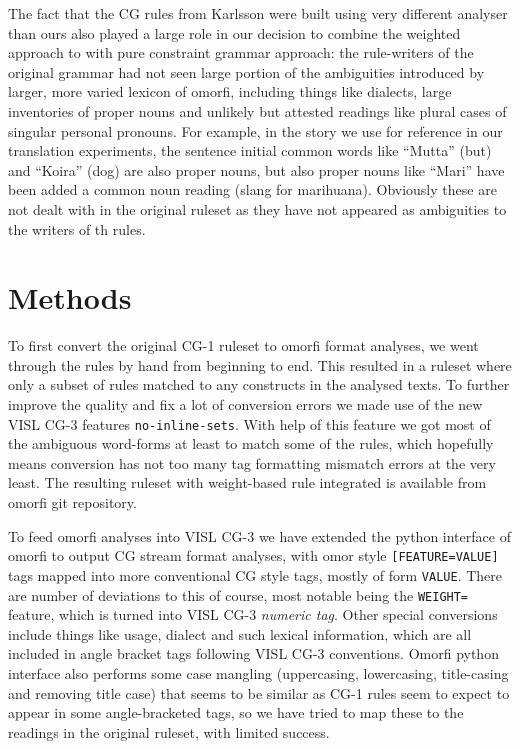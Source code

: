 \documentclass[11pt]{article}
\begin{document}
The fact that the CG rules from Karlsson were built using very different
analyser than ours also played a large role in our decision to combine the
weighted approach to with pure constraint grammar approach: the rule-writers
of the original grammar had not seen large portion of the ambiguities
introduced by larger, more varied lexicon of omorfi, including things like
dialects, large inventories of proper nouns and unlikely but attested
readings like plural cases of singular personal pronouns. For example, in
the story we use for reference in our translation experiments, the sentence
initial common words like ``Mutta'' (but) and ``Koira'' (dog)  are also
proper nouns, but also proper nouns like ``Mari'' have been added a
common noun reading (slang for marihuana). Obviously these are not dealt with
in the original ruleset as they have not appeared as ambiguities to the
writers of th rules.

\section{Methods}
\label{sec:methods}

To first convert the original CG-1 ruleset to omorfi format analyses, we went
through the rules by hand from beginning to end. This resulted in a ruleset
where only a subset of rules matched to any constructs in the analysed texts.
To further improve the quality and fix a lot of conversion errors we made use
of the new VISL CG-3 features \texttt{no-inline-sets}. With help of this
feature we got most of the ambiguous word-forms at least to match some of the
rules, which hopefully means conversion has not too many tag formatting 
mismatch errors at the very least. The resulting ruleset with weight-based
rule integrated is available from omorfi git repository.

To feed omorfi analyses into VISL CG-3 we have extended the python interface
of omorfi to output CG stream format analyses, with omor style
\texttt{[FEATURE=VALUE]} tags mapped into more conventional CG style tags,
mostly of form \texttt{VALUE}. There are number of deviations to this of
course, most notable being the \texttt{WEIGHT=} feature, which is turned into
VISL CG-3 \emph{numeric tag}. Other special conversions include things like
usage, dialect and such lexical information, which are all included in angle
bracket tags following VISL CG-3 conventions. Omorfi python interface also
performs some case mangling (uppercasing, lowercasing, title-casing and
removing title case) that seems to be similar as CG-1 rules seem to expect to
appear in some angle-bracketed tags, so we have tried to map these to the
readings in the original ruleset, with limited success. 
\end{document}
